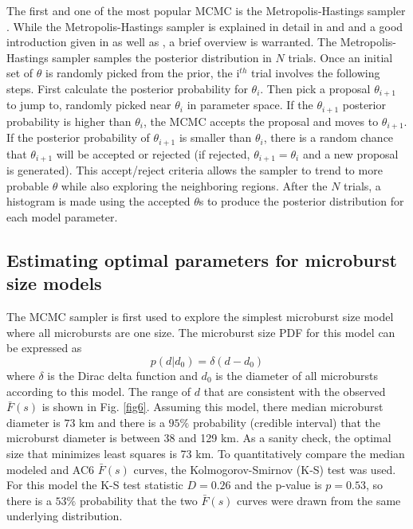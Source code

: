 \documentclass[draft]{agujournal2019}
\begin{document}
The first and one of the most popular MCMC is the Metropolis-Hastings sampler \cite{Metropolis1953, Hastings1970}. While the Metropolis-Hastings sampler is explained in detail in  and  and a good introduction given in  as well as , a brief overview is warranted. The Metropolis-Hastings sampler samples the posterior distribution in $N$ trials. Once an initial set of $\theta$ is randomly picked from the prior, the i$^{th}$ trial involves the following steps. First calculate the posterior probability for $\theta_i$. Then pick a proposal $\theta_{i+1}$ to jump to, randomly picked near $\theta_i$ in parameter space. If the $\theta_{i+1}$ posterior probability is higher than $\theta_i$, the MCMC accepts the proposal and moves to $\theta_{i+1}$. If the posterior probability of $\theta_{i+1}$ is smaller than $\theta_{i}$, there is a random chance that $\theta_{i+1}$ will be accepted or rejected (if rejected, $\theta_{i+1} = \theta_i$ and a new proposal is generated). This accept/reject criteria allows the sampler to trend to more probable $\theta$ while also exploring the neighboring regions. After the $N$ trials, a histogram is made using the accepted $\theta$s to produce the posterior distribution for each model parameter.


\subsection{Estimating optimal parameters for microburst size models}
The MCMC sampler is first used to explore the simplest microburst size model where all microbursts are one size. The microburst size PDF for this model can be expressed as
\begin{equation}
p(d | d_0) = \delta(d-d_0)
\end{equation} where $\delta$ is the Dirac delta function and $d_0$ is the diameter of all microbursts according to this model. The range of $d$ that are consistent with the observed $\bar{F}(s)$ is shown in Fig. \ref{fig6}. Assuming this model, there median microburst diameter is $73$ km and there is a $95 \%$ probability (credible interval) that the microburst diameter is between 38 and 129 km. As a sanity check, the optimal size that minimizes least squares is 73 km. To quantitatively compare the median modeled and AC6 $\bar{F}(s)$ curves, the Kolmogorov-Smirnov (K-S) test was used. For this model the K-S test statistic $D = 0.26$ and the p-value is $p = 0.53$, so there is a $53 \% $ probability that the two $\bar{F}(s)$ curves were drawn from the same underlying distribution.
\end{document}
